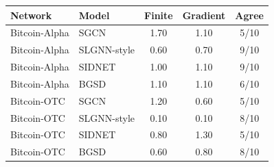 \begin{tabular}{@{}llccc@{}}
\toprule
Network & Model & Finite & Gradient & Agree \\
\midrule
Bitcoin-Alpha & SGCN & 1.70 & 1.10 & 5/10 \\
Bitcoin-Alpha & SLGNN-style & 0.60 & 0.70 & 9/10 \\
Bitcoin-Alpha & SIDNET & 1.00 & 1.10 & 9/10 \\
Bitcoin-Alpha & BGSD & 1.10 & 1.10 & 6/10 \\
Bitcoin-OTC & SGCN & 1.20 & 0.60 & 5/10 \\
Bitcoin-OTC & SLGNN-style & 0.10 & 0.10 & 8/10 \\
Bitcoin-OTC & SIDNET & 0.80 & 1.30 & 5/10 \\
Bitcoin-OTC & BGSD & 0.60 & 0.80 & 8/10 \\
\bottomrule
\end{tabular}
